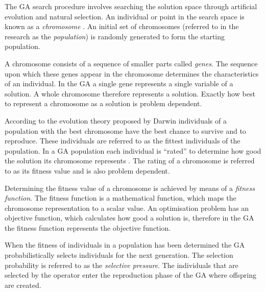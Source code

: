 The \gls{GA} search procedure involves searching the solution space through artificial evolution and natural selection\cite{FamilyGA,MultiPopGA,HybridIntelliGA}. An individual or point in the search space is known as a \emph{chromosome} \cite{HumanPassiveGA}. An initial set of chromosomes (referred to in the research as the \emph{population}) is randomly generated to form the starting population\cite{FamilyGA,HybridIntelliGA,AcceleratingGA,MultiPopGA}. 

A chromosome consists of a sequence of smaller parts called \emph{genes}\cite{CompuIntelligenceIntro}. The sequence upon which these genes appear in the chromosome determines the characteristics of an individual\cite{CompuIntelligenceIntro}. In the \gls{GA} a single gene represents a single variable of a solution\cite{FamilyGA,AcceleratingGA}. A whole chromosome therefore represents a solution\cite{FamilyGA,AcceleratingGA}. Exactly how best to represent a chromosome as a solution is problem dependent\cite{CompuIntelligenceIntro}.

According to the evolution theory proposed by Darwin individuals of a population with the best chromosome have the best chance to survive and to reproduce\cite{CompuIntelligenceIntro}. These individuals are referred to as the fittest individuals of the population. In a \gls{GA} population each individual is ``rated'' to determine how good the solution its chromosome represents \cite{CompuIntelligenceIntro}. The rating of a chromosome is referred to as its fitness value and is also problem dependent\cite{CompuIntelligenceIntro}.

Determining the fitness value of a chromosome is achieved by means of a \emph{fitness function}. The fitness function is a mathematical function, which maps the chromosome representation to a scalar value\cite{CompuIntelligenceIntro}. An optimisation problem has an objective function, which calculates how good a solution is, therefore in the \gls{GA} the fitness function represents the objective function\cite{CompuIntelligenceIntro}.

When the fitness of individuals in a population has been determined the \gls{GA} probabilistically selects individuals for the next generation\cite{CompuIntelligenceIntro}. The selection probability is referred to as the \emph{selective pressure}\cite{CompuIntelligenceIntro}. The individuals that are selected by the operator enter the reproduction phase of the \gls{GA} where offspring are created\cite{CompuIntelligenceIntro}.

